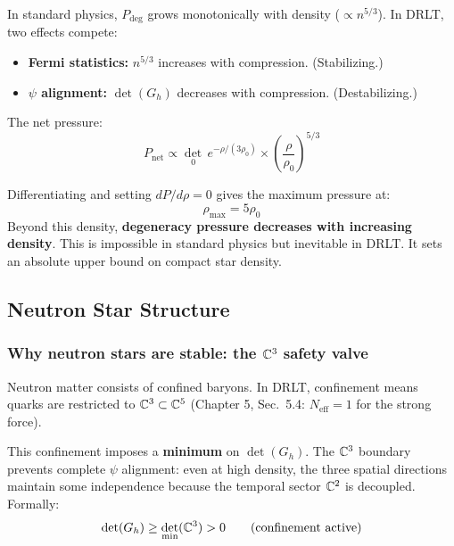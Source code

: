 In standard physics, $P_\text{deg}$ grows monotonically with density ($\propto n^{5/3}$). In DRLT, two effects compete:
\begin{itemize}
\item \textbf{Fermi statistics:} $n^{5/3}$ increases with compression. (Stabilizing.)
\item \textbf{$\psi$ alignment:} $\det(G_h)$ decreases with compression. (Destabilizing.)
\end{itemize}

The net pressure:
\begin{equation}
P_\text{net} \propto \det_0\,e^{-\rho/(3\rho_0)} \times \left(\frac{\rho}{\rho_0}\right)^{5/3}
\end{equation}

Differentiating and setting $dP/d\rho = 0$ gives the maximum pressure at:
\begin{equation}
\rho_\text{max} = 5\rho_0
\end{equation}
Beyond this density, \textbf{degeneracy pressure decreases with increasing density}. This is impossible in standard physics but inevitable in DRLT. It sets an absolute upper bound on compact star density.

\subsection{Neutron Star Structure}

\subsubsection{Why neutron stars are stable: the $\mathbb{C}^3$ safety valve}

Neutron matter consists of confined baryons. In DRLT, confinement means quarks are restricted to $\mathbb{C}^3 \subset \mathbb{C}^5$ (Chapter 5, Sec.~5.4: $N_\text{eff} = 1$ for the strong force).

This confinement imposes a \textbf{minimum} on $\det(G_h)$. The $\mathbb{C}^3$ boundary prevents complete $\psi$ alignment: even at high density, the three spatial directions maintain some independence because the temporal sector $\mathbb{C}^2$ is decoupled. Formally:
\begin{equation}
\det(G_h) \geq \det_\text{min}(\mathbb{C}^3) > 0 \qquad \text{(confinement active)}
\end{equation}

